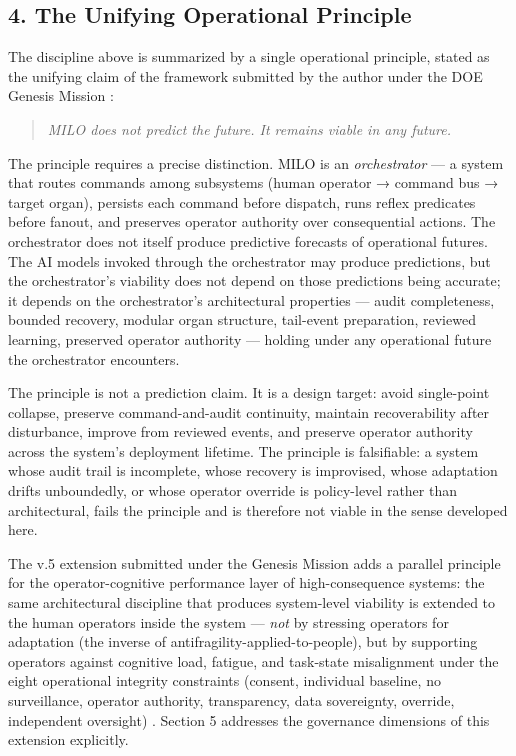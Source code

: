 \subsection{4. The Unifying Operational
Principle}\label{the-unifying-operational-principle}

The discipline above is summarized by a single operational principle,
stated as the unifying claim of the framework submitted by the author
under the DOE Genesis Mission \cite{ref5}:

\begin{quote}
\emph{MILO does not predict the future. It remains viable in any
future.}
\end{quote}

The principle requires a precise distinction. MILO is an
\emph{orchestrator} --- a system that routes commands among subsystems
(human operator → command bus → target organ), persists each command
before dispatch, runs reflex predicates before fanout, and preserves
operator authority over consequential actions. The orchestrator does not
itself produce predictive forecasts of operational futures. The AI
models invoked through the orchestrator may produce predictions, but the
orchestrator's viability does not depend on those predictions being
accurate; it depends on the orchestrator's architectural properties ---
audit completeness, bounded recovery, modular organ structure,
tail-event preparation, reviewed learning, preserved operator authority
--- holding under any operational future the orchestrator encounters.

The principle is not a prediction claim. It is a design target: avoid
single-point collapse, preserve command-and-audit continuity, maintain
recoverability after disturbance, improve from reviewed events, and
preserve operator authority across the system's deployment lifetime. The
principle is falsifiable: a system whose audit trail is incomplete,
whose recovery is improvised, whose adaptation drifts unboundedly, or
whose operator override is policy-level rather than architectural, fails
the principle and is therefore not viable in the sense developed here.

The v.5 extension submitted under the Genesis Mission adds a parallel
principle for the operator-cognitive performance layer of
high-consequence systems: the same architectural discipline that
produces system-level viability is extended to the human operators
inside the system --- \emph{not} by stressing operators for adaptation
(the inverse of antifragility-applied-to-people), but by supporting
operators against cognitive load, fatigue, and task-state misalignment
under the eight operational integrity constraints (consent, individual
baseline, no surveillance, operator authority, transparency, data
sovereignty, override, independent oversight) \cite{ref5}. Section 5
addresses the governance dimensions of this extension explicitly.

